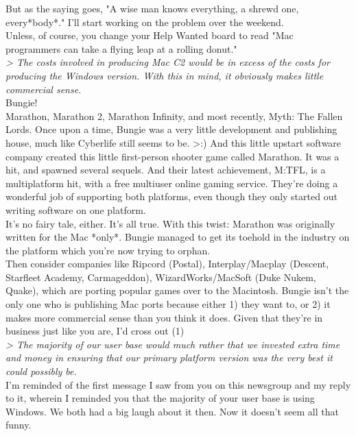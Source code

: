 \documentclass[11pt,twoside,a4paper]{article}
\begin{document}
\begin{multicols*}{2}
But as the saying goes, "A wise man knows everything, a shrewd one, every*body*." I'll start working on the problem over the weekend.~\\

Unless, of course, you change your Help Wanted board to read "Mac programmers can take a flying leap at a rolling donut."~\\

\emph{> The costs involved in producing Mac C2 would be in excess of the costs for producing the Windows version. With this in mind, it obviously makes little commercial sense.}~\\

Bungie!~\\

Marathon, Marathon 2, Marathon Infinity, and most recently, Myth: The Fallen Lords. Once upon a time, Bungie was a very little development and publishing house, much like Cyberlife still seems to be. >:) And this little upstart software company created this little first-person shooter game called Marathon. It was a hit, and spawned several sequels. And their latest achievement, M:TFL, is a multiplatform hit, with a free multiuser online gaming service. They're doing a wonderful job of supporting both platforms, even though they only started out writing software on one platform.~\\

It's no fairy tale, either. It's all true. With this twist: Marathon was originally written for the Mac *only*. Bungie managed to get its toehold in the industry on the platform which you're now trying to orphan.~\\

Then consider companies like Ripcord (Postal), Interplay/Macplay (Descent, Starfleet Academy, Carmageddon), WizardWorks/MacSoft (Duke Nukem, Quake), which are porting popular games over to the Macintosh. Bungie isn't the only one who is publishing Mac ports because either 1) they want to, or 2) it makes more commercial sense than you think it does. Given that they're in business just like you are, I'd cross out (1)~\\

\emph{> The majority of our user base would much rather that we invested extra time and money in ensuring that our primary platform version was the very best it could possibly be.}~\\

I'm reminded of the first message I saw from you on this newsgroup and my reply to it, wherein I reminded you that the majority of your user base is using Windows. We both had a big laugh about it then. Now it doesn't seem all that funny.~\\


\end{multicols*}
\end{document}
